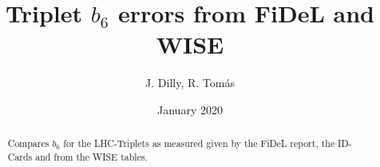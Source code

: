 \documentclass[usenames,dvipsnames]{cernatsnote}    %
\date{January 2020}
\title{Triplet $b_6$ errors from FiDeL and WISE}
\author{J. Dilly, R. Tom\'as}
\begin{document}
\maketitle 

\begin{abstract}
    Compares $b_6$ for the LHC-Triplets as measured given by the FiDeL report, 
    the ID-Cards and from the WISE tables.
\end{abstract}

\tableofcontents
\newpage



\FloatBarrier


% 

\FloatBarrier



% 
\clearpage

% 
\end{document}
